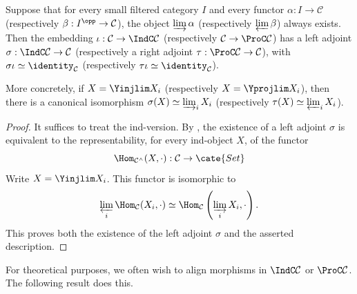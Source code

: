 \begin{proposition}\label{prop:Ind-adjunction}
	Suppose that for every small filtered category $I$ and every functor $\alpha:I\to\mathcal{C}$ (respectively $\beta:I^{\opp}\to\mathcal{C}$), the object $\varinjlim\alpha$ (respectively $\varprojlim\beta$) always exists. Then the embedding
	$\iota:\mathcal{C}\to\IndC\mathcal{C}$ (respectively
	$\mathcal{C}\to\ProC\mathcal{C}$) has a left adjoint
	$\sigma:\IndC\mathcal{C}\to\mathcal{C}$ (respectively a right adjoint
	$\tau:\ProC\mathcal{C}\to\mathcal{C}$), with
	$\sigma\iota\simeq\identity_{\mathcal{C}}$ (respectively
	$\tau\iota\simeq\identity_{\mathcal{C}}$).

	More concretely, if $X=\Yinjlim X_i$ (respectively $X=\Yprojlim X_i$), then there is a canonical isomorphism
	$\sigma(X)\simeq\varinjlim_iX_i$ (respectively
	$\tau(X)\simeq\varprojlim_iX_i$).
\end{proposition}
\begin{proof}
	It suffices to treat the ind-version. By \cite[Proposition 2.6.9]{Li1}, the existence of a left adjoint $\sigma$ is equivalent to the representability, for every ind-object $X$, of the functor
	\[ \Hom_{\mathcal{C}^\wedge}(X, \cdot): \mathcal{C} \to \cate{Set} \]
	Write $X=\Yinjlim X_i$. This functor is isomorphic to
	\[ \varprojlim_i \Hom_{\mathcal{C}}(X_i, \cdot) \simeq \Hom_{\mathcal{C}}\left( \varinjlim_i X_i, \cdot\right). \]
	This proves both the existence of the left adjoint $\sigma$ and the asserted description.
\end{proof}

For theoretical purposes, we often wish to align morphisms in $\IndC\mathcal{C}$ or $\ProC\mathcal{C}$. The following result does this.

